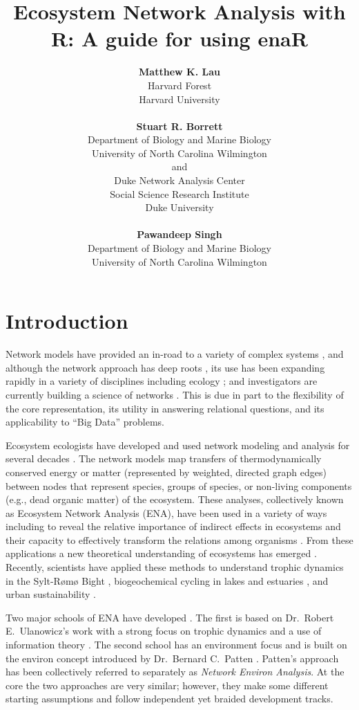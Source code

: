 \documentclass[article]{jss}
\author{
  \textbf{Matthew K. Lau}\\Harvard Forest\\Harvard University\\
  \\
  \textbf{Stuart R. Borrett}\\Department of Biology and Marine Biology\\
  University of North Carolina Wilmington\\and\\Duke Network
  Analysis Center\\Social Science Research Institute\\Duke
  University\\
  \\
  \textbf{Pawandeep Singh}\\Department of Biology and Marine Biology\\
  University of North Carolina Wilmington\\}
\title{Ecosystem Network Analysis with R: A guide for using enaR}
\begin{document}


\section[Introduction]{Introduction}
Network models have provided an in-road to a variety of complex
systems \citep{watts1998collective, newman01scientific1, barabasi12,
  newman06structure, wasserman1994}, and although the network approach
has deep roots \citep{newman06structure}, its use has been expanding
rapidly in a variety of disciplines including ecology
\citep{borrett14_rise, ings2009}; and investigators are currently
building a science of networks \citep{nrc06network, brandes13}. This
is due in part to the flexibility of the core representation, its
utility in answering relational questions, and its applicability to
``Big Data'' problems.


Ecosystem ecologists have developed and used network modeling and
analysis for several decades \citep{borrett12_netecol, ulanowicz86,
  fath99_review}.  The network models map transfers of
thermodynamically conserved energy or matter (represented by weighted,
directed graph edges) between nodes that represent species, groups of
species, or non-living components (e.g., dead organic matter) of the
ecosystem.  These analyses, collectively known as Ecosystem Network
Analysis (ENA), have been used in a variety of ways including to
reveal the relative importance of indirect effects in ecosystems
\citep{patten83, higashi89, salas11_did} and their capacity to
effectively transform the relations among organisms
\citep{ulanowicz90, patten91, fath98, bondavalli99}.  From these
applications a new theoretical understanding of ecosystems has emerged
\citep{higashi91, belgrano05, jorgensen07_newecology}.  Recently,
scientists have applied these methods to understand trophic
dynamics in the Sylt-R{\o}m{\o} Bight
\citep{baird04_sylt,baird08_sylt}, biogeochemical cycling in lakes and
estuaries \citep{christian03, small2014, hines15}, and urban
sustainability \citep{zhang10, chen12}.

Two major schools of ENA have developed \citep{scharler09comparing}.
The first is based on Dr.\ Robert E.\ Ulanowicz's work with a strong
focus on trophic dynamics and a use of information theory
\citep{ulanowicz86, ulanowicz97, ulanowicz04}.  The second school has
an environment focus and is built on the environ concept introduced by
Dr.\ Bernard C.\ Patten \citep{patten76, patten78, fath99_review}.
Patten's approach has been collectively referred to separately as
\emph{Network Environ Analysis}. At the core the two approaches are
very similar; however, they make some different starting assumptions
and follow independent yet braided development tracks.
\end{document}
